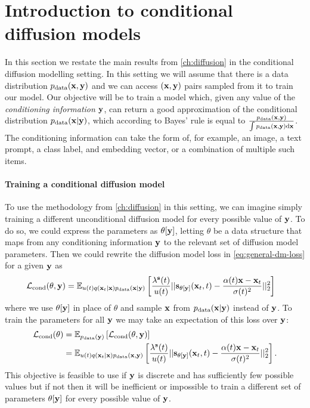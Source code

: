 \section{Introduction to conditional diffusion models} \label{sec:conditional-diffusion-overview}

In this section we restate the main results from \cref{ch:diffusion} in the conditional diffusion modelling setting. In this setting we will assume that there is a data distribution $p_\text{data}({\mathbf{x}}, {\mathbf{y}})$ and we can access $({\mathbf{x}}, {\mathbf{y}})$ pairs sampled from it to train our model. Our objective will be to train a model which, given any value of the \textit{conditioning information} ${\mathbf{y}}$, can return a good approximation of the conditional distribution $p_\text{data}({\mathbf{x}}|{\mathbf{y}})$, which according to Bayes' rule is equal to $\frac{p_\text{data}({\mathbf{x}},{\mathbf{y}})}{\int p_\text{data}({\mathbf{x}},{\mathbf{y}}) \mathrm{d}{\mathbf{x}}}$. The conditioning information can take the form of, for example, an image, a text prompt, a class label, and embedding vector, or a combination of multiple such items.

\paragraph{Training a conditional diffusion model}
To use the methodology from \cref{ch:diffusion} in this setting, we can imagine simply training a different unconditional diffusion model for every possible value of ${\mathbf{y}}$. To do so, we could express the parameters as $\theta[{\mathbf{y}}]$, letting $\theta$ be a data structure that maps from any conditioning information ${\mathbf{y}}$ to the relevant set of diffusion model parameters. Then we could rewrite the diffusion model loss in \cref{eq:general-dm-loss} for a given ${\mathbf{y}}$ as
\begin{align} \label{eq:cond-diffusion-loss-single-y}
    \mathcal{L}_\text{cond}(\theta, {\mathbf{y}}) &= \mathbb{E}_{u(t)q({\mathbf{x}}_t|{\mathbf{x}})p_{\rm{data}}({\mathbf{x}}|{\mathbf{y}})} \left[ \frac{\lambda^{\mathbf{s}}(t)}{u(t)} 
    || {\mathbf{s}}_{\theta[{\mathbf{y}}]}({\mathbf{x}}_t, t) - \frac{\alpha(t){\mathbf{x}}-{\mathbf{x}}_t}{\sigma(t)^2} ||_2^2 \right]
\end{align}
where we use $\theta[{\mathbf{y}}]$ in place of $\theta$ and sample ${\mathbf{x}}$ from $p_{\rm{data}}({\mathbf{x}}|{\mathbf{y}})$ instead of ${\mathbf{y}}$. To train the parameters for all ${\mathbf{y}}$ we may take an expectation of this loss over ${\mathbf{y}}$:
\begin{align} \label{eq:cond-exp-diffusion-loss-all-sigma}
    {\mathcal{L}}_\text{cond}(\theta) &= \mathbb{E}_{p_{\rm{data}}({\mathbf{y}})} \left[ {\mathcal{L}}_\text{cond}(\theta, {\mathbf{y}}) \right] \\
    &= \mathbb{E}_{u(t)q({\mathbf{x}}_t|{\mathbf{x}})p_{\rm{data}}({\mathbf{x}}, {\mathbf{y}})} \left[ \frac{\lambda^{\mathbf{s}}(t)}{u(t)} 
    || {\mathbf{s}}_{\theta[{\mathbf{y}}]}({\mathbf{x}}_t, t) - \frac{\alpha(t){\mathbf{x}}-{\mathbf{x}}_t}{\sigma(t)^2} ||_2^2 \right].
\end{align}
This objective is feasible to use if ${\mathbf{y}}$ is discrete and has sufficiently few possible values but if not then it will be inefficient or impossible to train a different set of parameters $\theta[{\mathbf{y}}]$ for every possible value of ${\mathbf{y}}$.

